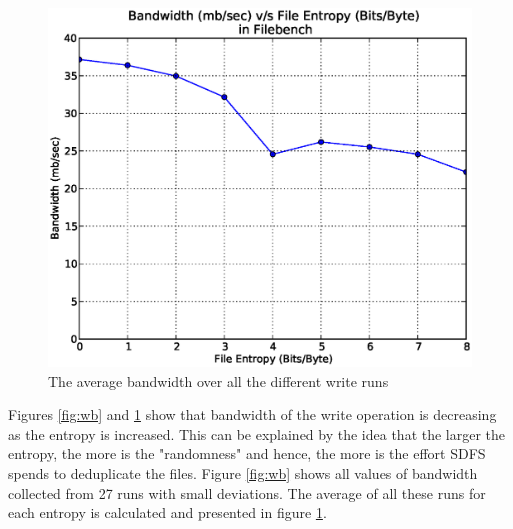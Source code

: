 \begin{figure}[H]
\begin{center}
\includegraphics[scale=.55]{../results/set1/write_bw_avg.eps}
\caption{The average bandwidth over all the different write runs}
\label{fig:wbavg}
\end{center}
\end{figure}
\noindent Figures \ref{fig:wb} and \ref{fig:wbavg} show that bandwidth of the write operation is decreasing as the entropy is increased. This can be explained by the idea that the larger the entropy, the more is the "randomness" and hence, the more is the effort SDFS spends to deduplicate the files. Figure \ref{fig:wb} shows all values of bandwidth collected from 27 runs with small deviations. The average of all these runs for each entropy is calculated and presented in figure \ref{fig:wbavg}.

